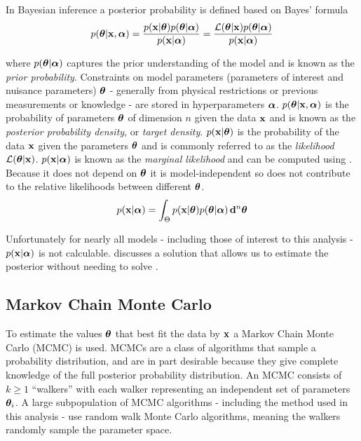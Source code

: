 In Bayesian inference a posterior probability is defined based on Bayes' formula
\begin{equation}
p(\boldsymbol{\theta}|\mathbf{x}, \boldsymbol{\alpha}) = \frac{p(\mathbf{x}|\boldsymbol{\theta})
p(\boldsymbol{\theta}|\boldsymbol{\alpha})}{p(\mathbf{x}|\boldsymbol{\alpha})} = \frac{\mathcal{L}(\boldsymbol{\theta}|\mathbf{x})
p(\boldsymbol{\theta}|\boldsymbol{\alpha})}{p(\mathbf{x}|\boldsymbol{\alpha})}
\end{equation}

\noindent where $p(\boldsymbol{\theta}|\boldsymbol{\alpha})$ captures the prior understanding of the model and is known as the
\textit{prior probability}.  Constraints on model parameters (parameters of interest and nuisance parameters) $\boldsymbol{\theta}$ - generally
from physical restrictions or previous measurements or
knowledge - are stored in hyperparameters $\boldsymbol{\alpha}$.  $p(\boldsymbol{\theta}|\mathbf{x}, \boldsymbol{\alpha})$ is the probability of
parameters $\boldsymbol{\theta}$ of dimension $n$ given the
data $\mathbf{x}$ and is known as the \textit{posterior probability density}, or \textit{target
density}.  $p(\mathbf{x}|\boldsymbol{\theta})$ is the probability of the data $\mathbf{x}$ given the parameters
$\boldsymbol{\theta}$ and is
commonly referred to as the \textit{likelihood} $\mathcal{L}(\boldsymbol{\theta}|\mathbf{x})$.  $p(\mathbf{x}|\boldsymbol{\alpha})$ is known as
the \textit{marginal likelihood}
and can be computed using .  Because it does not depend on
$\boldsymbol{\theta}$ it is model-independent so does not contribute to the relative likelihoods between different
$\boldsymbol{\theta}$.
\begin{equation}
p(\mathbf{x}|\boldsymbol{\alpha}) = \int_{\Theta} p(\mathbf{x}|\boldsymbol{\theta}) p(\boldsymbol{\theta}|\boldsymbol{\alpha})\, \mathbf{d}^n \boldsymbol{\theta}
\label{eq:er_nr_calibrations_parameter_determ_mc_match_p_data}
\end{equation}

Unfortunately for nearly all models - including those of interest to this analysis - $p(\mathbf{x}|\boldsymbol{\alpha})$ is not
calculable.   discusses a solution that allows us to estimate the posterior
without needing to solve .



\subsection{Markov Chain Monte Carlo}
\label{subsec:er_nr_calibrations_parameter_determ_mcmc}
To estimate the values $\boldsymbol{\theta}$ that best fit the data by $\mathbf{x}$ a Markov Chain Monte Carlo (MCMC) is used.  MCMCs
are a class of algorithms that sample a probability distribution, and are in part desirable because they
give complete knowledge of the full posterior probability
distribution.  An MCMC consists of $k \geq 1$ ``walkers'' with each walker representing an independent set of parameters
$\boldsymbol{\theta}_i$.  A large
subpopulation of MCMC algorithms - including the method used in this analysis - use random walk Monte Carlo algorithms, meaning the
walkers randomly sample the parameter space.

